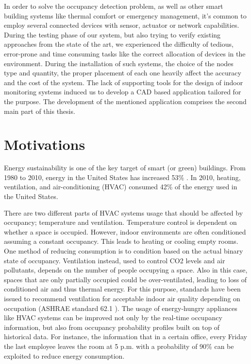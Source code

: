 In order to solve the occupancy detection problem, as well as other smart building systems like thermal comfort or emergency management, it's common to employ several connected devices with sensor, actuator or network capabilities. During the testing phase of our system, but also trying to verify existing approaches from the state of the art, we experienced the difficulty of tedious, error-prone and time consuming tasks like the correct allocation of devices in the environment. During the installation of such systems, the choice of the nodes type and quantity, the proper placement of each one heavily affect the accuracy and the cost of the system. The lack of supporting tools for the design of indoor monitoring systems induced us to develop a CAD based application tailored for the purpose. The development of the mentioned application comprises the second main part of this thesis.




%
\section{Motivations}
Energy sustainability is one of the key target of smart (or green) buildings.
From 1980 to 2010, energy in the United States has increased 53\% \cite{doe}. In 2010, heating, ventilation, and air-conditioning (HVAC) consumed 42\% of the energy used in the United States.

There are two different parts of HVAC systems usage that should be affected by occupancy; temperature and ventilation.
Temperature control is dependent on whether a space is occupied. However, indoor environments are often conditioned assuming a constant occupancy. This leads to heating or cooling empty rooms. One method of reducing consumption is to condition based on the actual binary state of occupancy.
Ventilation instead, used to control CO2 levels and air pollutants, depends on the number of people occupying a space. Also in this case, spaces that are only partially occupied could be over-ventilated, leading to loss of conditioned air and thus thermal energy. For this purpose, standards have been issued to recommend ventilation for acceptable indoor air quality depending on occupation (ASHRAE standard 62.1 \cite{ashrae}).
The usage of energy-hungry appliances like HVAC systems can be improved not only by the real-time occupancy information, but also from occupancy probability profiles built on top of historical data. For instance, the information that in a certain office, every Friday the last employee leaves the room at 5 p.m. with a probability of 90\% can be exploited to reduce energy consumption.

